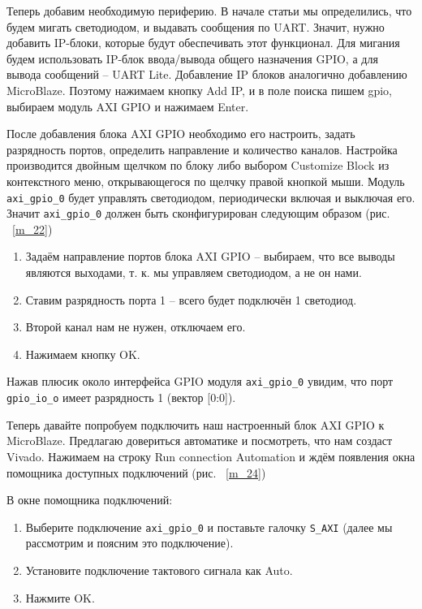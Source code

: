 \documentclass[a4paper,oneside ,14pt]{extreport}
\begin{document}
Теперь добавим необходимую периферию. В начале статьи мы определились, 
что будем мигать светодиодом, и выдавать сообщения по UART. Значит, нужно 
добавить IP-блоки, которые будут обеспечивать этот функционал. Для мигания 
будем использовать IP-блок ввода/вывода общего назначения GPIO, а для вывода сообщений – UART Lite.
Добавление IP блоков аналогично добавлению MicroBlaze. Поэтому нажимаем 
кнопку Add IP, и в поле поиска пишем gpio, выбираем модуль AXI GPIO и нажимаем 
Enter.

После добавления блока AXI GPIO необходимо его настроить, задать 
разрядность портов, определить направление и количество каналов. Настройка 
производится двойным щелчком по блоку либо выбором Customize Block из 
контекстного меню, открывающегося по щелчку правой кнопкой мыши. Модуль
\verb|axi_gpio_0| будет управлять светодиодом, периодически включая и выключая его. 
Значит \verb|axi_gpio_0| должен быть сконфигурирован следующим образом (рис. ~\ref{m_22})

\begin{enumerate}
	\item Задаём направление портов блока AXI GPIO – выбираем, что все выводы 
являются выходами, т. к. мы управляем светодиодом, а не он нами.
	\item Ставим разрядность порта 1 – всего будет подключён 1 светодиод.
	\item Второй канал нам не нужен, отключаем его.
	\item Нажимаем кнопку OK.
\end{enumerate}

Нажав плюсик около интерфейса GPIO модуля \verb|axi_gpio_0| увидим, что порт 
\verb|gpio_io_o| имеет разрядность 1 (вектор [0:0]).

Теперь давайте попробуем подключить наш настроенный блок AXI GPIO к 
MicroBlaze. Предлагаю довериться автоматике и посмотреть, что нам создаст 
Vivado. Нажимаем на строку Run connection Automation и ждём 
появления окна помощника доступных подключений (рис. ~\ref{m_24})

В окне помощника подключений:
\begin{enumerate}
	\item Выберите подключение  \verb|axi_gpio_0| и поставьте галочку \verb|S_AXI| (далее мы 
рассмотрим и поясним это подключение).
	\item Установите подключение тактового сигнала как Auto.
	\item Нажмите OK.
\end{enumerate}
\end{document}

